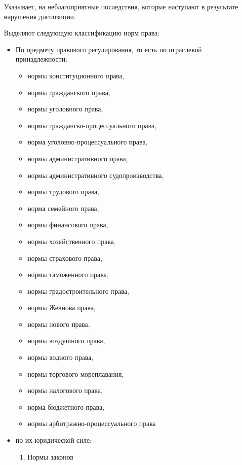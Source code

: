 \begin{definition}[Санкция]\label{def:sanction}
  Указывает, на неблагоприятные последствия, которые наступают в
  результате нарушения диспозиции.
\end{definition}

Выделяют следующую классификацию норм права:

\begin{itemize}
  \item По предмету правового регулирования, то есть по отраслевой
    принадлежности:
    \begin{itemize}
      \item нормы конституционного права,
      \item нормы гражданского права,
      \item нормы уголовного права,
      \item нормы гражданско-процессуального права,
      \item норма уголовно-процессуального права,
      \item нормы административного права,
      \item нормы административного судопроизводства,
      \item нормы трудового права,
      \item норма семейного права,
      \item нормы финансового права,
      \item нормы хозяйственного права,
      \item нормы страхового права,
      \item нормы таможенного права,
      \item нормы градостроительного права,
      \item нормы Жевнова права,
      \item нормы нового права,
      \item нормы воздушного права,
      \item нормы водного права,
      \item нормы торгового мореплавания,
      \item нормы налогового права,
      \item норма бюджетного права,
      \item нормы арбитражно-процессуального права
    \end{itemize}
  \item по их юридической силе:
    \begin{enumerate}
      \item Нормы законов

\end{enumerate}
\end{itemize}
